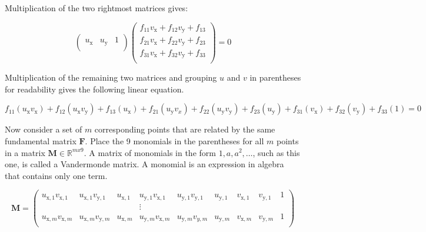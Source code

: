 Multiplication of the two rightmost matrices gives:

\begin{equation}
\begin{pmatrix}
u_\mathrm{x} & u_\mathrm{y} & 1 \\
\end{pmatrix}
\begin{pmatrix}
f_{11} v_\mathrm{x} + f_{12} v_\mathrm{y} + f_{13} \\
f_{21} v_\mathrm{x} + f_{22} v_\mathrm{y} + f_{23} \\
f_{31} v_\mathrm{x} + f_{32} v_\mathrm{y} + f_{33} \\
\end{pmatrix}
= 0
\end{equation}

Multiplication of the remaining two matrices and grouping $u$ and $v$ in parentheses for readability gives the following linear equation.

\begin{equation}
f_{11} (u_\mathrm{x} v_\mathrm{x}) + f_{12} (u_\mathrm{x} v_\mathrm{y}) + f_{13} (u_\mathrm{x}) +
f_{21} (u_\mathrm{y} v_x) + f_{22} (u_\mathrm{y} v_\mathrm{y}) + f_{23} (u_\mathrm{y}) +
f_{31} (v_\mathrm{x}) + f_{32} (v_\mathrm{y}) + f_{33} (1)
= 0
\end{equation}

Now consider a set of $m$ corresponding points that are related by the same fundamental matrix $\textbf{F}$. Place the 9 monomials in the parentheses for all $m$ points in a matrix $\textbf{M} \in \mathbb{R}^{mx9} $. A matrix of monomials in the form $1, a, a^2, \dots$, such as this one, is called a Vandermonde matrix. A monomial is an expression in algebra that contains only one term.

\begin{equation}
\mathbf{M}=
\begin{pmatrix}
u_{\mathrm{x},1} v_{\mathrm{x},1} & u_{\mathrm{x},1} v_{\mathrm{y},1} & u_{\mathrm{x},1} & u_{\mathrm{y},1} v_{\mathrm{x},1} & u_{\mathrm{y},1} v_{\mathrm{y},1} & u_{\mathrm{y},1} & v_{\mathrm{x},1} & v_{\mathrm{y},1} & 1 \\
 & & & \vdots & & & & & \\
u_{\mathrm{x},m} v_{\mathrm{x},m} & u_{\mathrm{x},m} v_{\mathrm{y},m} & u_{\mathrm{x},m} & u_{\mathrm{y},m} v_{\mathrm{x},m} & u_{\mathrm{y},m} v_{y,m} & u_{\mathrm{y},m} & v_{\mathrm{x},m} & v_{\mathrm{y},m} & 1 \\
\end{pmatrix}
\end{equation}


